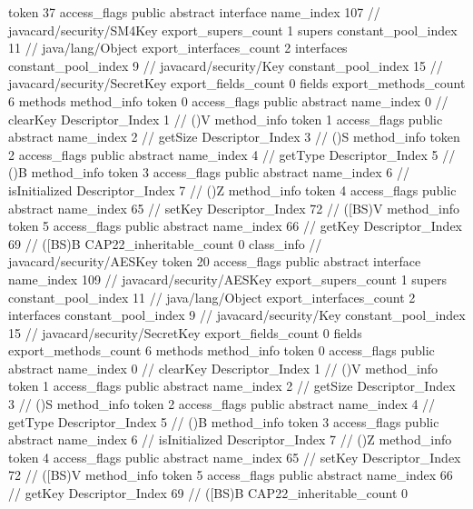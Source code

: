 {{{			token	37
			access_flags	public abstract interface
			name_index	107		// javacard/security/SM4Key
			export_supers_count	1
			supers {
				constant_pool_index	11		// java/lang/Object
			}
			export_interfaces_count	2
			interfaces {
				constant_pool_index	9		// javacard/security/Key
				constant_pool_index	15		// javacard/security/SecretKey
			}
			export_fields_count	0
			fields {
			}
			export_methods_count	6
			methods {
				method_info {
					token	0
					access_flags	public abstract
					name_index	0		// clearKey
					Descriptor_Index	1		// ()V
				}
				method_info {
					token	1
					access_flags	public abstract
					name_index	2		// getSize
					Descriptor_Index	3		// ()S
				}
				method_info {
					token	2
					access_flags	public abstract
					name_index	4		// getType
					Descriptor_Index	5		// ()B
				}
				method_info {
					token	3
					access_flags	public abstract
					name_index	6		// isInitialized
					Descriptor_Index	7		// ()Z
				}
				method_info {
					token	4
					access_flags	public abstract
					name_index	65		// setKey
					Descriptor_Index	72		// ([BS)V
				}
				method_info {
					token	5
					access_flags	public abstract
					name_index	66		// getKey
					Descriptor_Index	69		// ([BS)B
				}
			}
			CAP22_inheritable_count	0
		}
		class_info {		// javacard/security/AESKey
			token	20
			access_flags	public abstract interface
			name_index	109		// javacard/security/AESKey
			export_supers_count	1
			supers {
				constant_pool_index	11		// java/lang/Object
			}
			export_interfaces_count	2
			interfaces {
				constant_pool_index	9		// javacard/security/Key
				constant_pool_index	15		// javacard/security/SecretKey
			}
			export_fields_count	0
			fields {
			}
			export_methods_count	6
			methods {
				method_info {
					token	0
					access_flags	public abstract
					name_index	0		// clearKey
					Descriptor_Index	1		// ()V
				}
				method_info {
					token	1
					access_flags	public abstract
					name_index	2		// getSize
					Descriptor_Index	3		// ()S
				}
				method_info {
					token	2
					access_flags	public abstract
					name_index	4		// getType
					Descriptor_Index	5		// ()B
				}
				method_info {
					token	3
					access_flags	public abstract
					name_index	6		// isInitialized
					Descriptor_Index	7		// ()Z
				}
				method_info {
					token	4
					access_flags	public abstract
					name_index	65		// setKey
					Descriptor_Index	72		// ([BS)V
				}
				method_info {
					token	5
					access_flags	public abstract
					name_index	66		// getKey
					Descriptor_Index	69		// ([BS)B
				}
			}
			CAP22_inheritable_count	0
}}}
